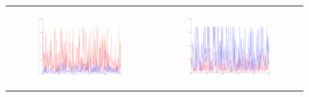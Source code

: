 \begin{figure}[!h]
  \centering
  \begin{tabular}[c]{cc}
    \begin{subfigure}[c]{0.5\textwidth, scale=0.5}
      \includegraphics[width=\textwidth]{imaxes/flexion.png}
      
    \end{subfigure}&
    \begin{subfigure}[c]{0.5\textwidth, scale=0.5}
      \includegraphics[width=\textwidth]{imaxes/extension.png}
      

\end{subfigure}
\end{tabular}
\end{figure}
